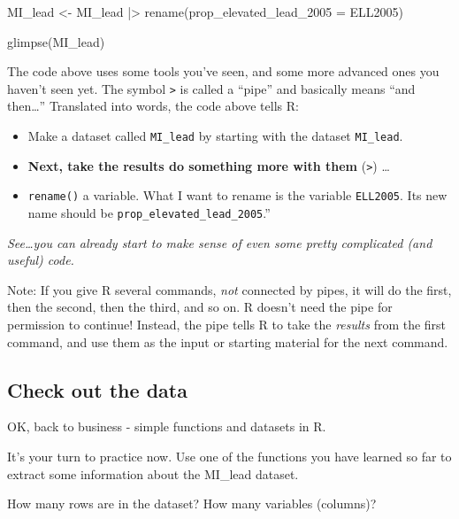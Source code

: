 \documentclass[
  letterpaper,
  DIV=11,
  numbers=noendperiod]{scrreprt}
\newenvironment{Shaded}{\begin{snugshade}}{\end{snugshade}}
\newcommand{\AttributeTok}[1]{\textcolor[rgb]{0.40,0.45,0.13}{#1}}
\newcommand{\FunctionTok}[1]{\textcolor[rgb]{0.28,0.35,0.67}{#1}}
\newcommand{\NormalTok}[1]{\textcolor[rgb]{0.00,0.23,0.31}{#1}}
\newcommand{\OtherTok}[1]{\textcolor[rgb]{0.00,0.23,0.31}{#1}}
\newcommand{\SpecialCharTok}[1]{\textcolor[rgb]{0.37,0.37,0.37}{#1}}
\providecommand{\tightlist}{%
  \setlength{\itemsep}{0pt}\setlength{\parskip}{0pt}}\usepackage{longtable,booktabs,array}
\theoremstyle{remark}
\begin{document}
\begin{Shaded}
\begin{Highlighting}[]
\NormalTok{MI\_lead }\OtherTok{\textless{}{-}}\NormalTok{ MI\_lead }\SpecialCharTok{|\textgreater{}}
  \FunctionTok{rename}\NormalTok{(}\AttributeTok{prop\_elevated\_lead\_2005 =}\NormalTok{ ELL2005)}

\FunctionTok{glimpse}\NormalTok{(MI\_lead)}
\end{Highlighting}
\end{Shaded}

The code above uses some tools you've seen, and some more advanced ones
you haven't seen yet. The symbol \texttt{\textbar{}\textgreater{}} is
called a ``pipe'' and basically means ``and then\ldots{}'' Translated
into words, the code above tells R:

\begin{itemize}
\tightlist
\item
  Make a dataset called \texttt{MI\_lead} by starting with the dataset
  \texttt{MI\_lead}.
\item
  \textbf{Next, take the results do something more with them}
  (\texttt{\textbar{}\textgreater{}}) \ldots{}
\item
  \texttt{rename()} a variable. What I want to rename is the variable
  \texttt{ELL2005}. Its new name should be
  \texttt{prop\_elevated\_lead\_2005}.''
\end{itemize}

\emph{See\ldots you can already start to make sense of even some pretty
complicated (and useful) code.}

Note: If you give R several commands, \emph{not} connected by pipes, it
will do the first, then the second, then the third, and so on. R doesn't
need the pipe for permission to continue! Instead, the pipe tells R to
take the \emph{results} from the first command, and use them as the
input or starting material for the next command.

\subsection{Check out the data}\label{check-out-the-data}

OK, back to business - simple functions and datasets in R.

It's your turn to practice now. Use one of the functions you have
learned so far to extract some information about the MI\_lead dataset.

How many rows are in the dataset? How many variables (columns)?
\end{document}

